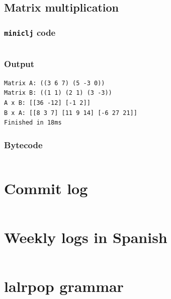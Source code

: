 \documentclass[11pt]{scrreprt}
\begin{document}
\section{Matrix multiplication}
\subsection{\texttt{miniclj} code}
\inputminted{clojure}{/home/mario/git/MarioJim/miniclj/examples/matrix_multiplication.clj}

\subsection{Output}
\begin{verbatim}
Matrix A: ((3 6 7) (5 -3 0))
Matrix B: ((1 1) (2 1) (3 -3))
A x B: [[36 -12] [-1 2]]
B x A: [[8 3 7] [11 9 14] [-6 27 21]]
Finished in 18ms
\end{verbatim}

\subsection{Bytecode}
\inputminted{text}{/home/mario/git/MarioJim/miniclj/examples/matrix_multiplication.mclj}


\appendix


\chapter{Commit log}
\label{apdx:commits}
\inputminted[bgcolor=white]{text}{/home/mario/git/MarioJim/miniclj/docs/commits.txt}

\chapter{Weekly logs in Spanish}
\label{apdx:weeklylogs}
\inputminted[bgcolor=white,breaklines=true]{md}{/home/mario/git/MarioJim/miniclj/docs/logs.md}

\chapter{lalrpop grammar}
\label{apdx:grammar}
\inputminted{rust}{/home/mario/git/MarioJim/miniclj/miniclj-lib/src/parsers/lispparser.lalrpop}
\end{document}
